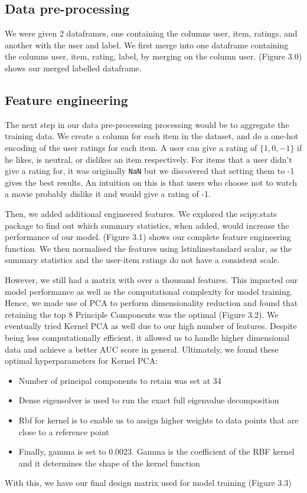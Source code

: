\documentclass[12pt]{article}
\begin{document}
\subsection{Data pre-processing}
We were given 2 dataframes, one containing the columns user, item, ratings, and another with the user and label. We first merge into one dataframe containing the columns user, item, rating, label, by merging on the column user. (Figure 3.0) shows our merged labelled dataframe.
\subsection{Feature engineering}
The next step in our data pre-processing processing would be to aggregate the training data. We create a column for each item in the dataset, and do a one-hot encoding of the user ratings for each item. A user can give a rating of $\{1, 0, -1\}$ if he likes, is neutral, or dislikes an item respectively. For items that a user didn't give a rating for, it was originally \lstinline{NaN} but we discovered that setting them to -1 gives the best results. An intuition on this is that users who choose not to watch a movie probably dislike it and would give a rating of -1.

Then, we added additional engineered features. We explored the scipy.stats package to find out which summary statistics, when added, would increase the performance of our model. (Figure 3.1) shows our complete feature engineering function. We then normalised the features using lstinline{standard scalar}, as the summary statistics and the user-item ratings do not have a consistent scale.

However, we still had a matrix with over a thousand features. This impacted our model performance as well as the computational complexity for model training. Hence, we made use of PCA to perform dimensionality reduction and found that retaining the top 8 Principle Components was the optimal (Figure 3.2). We eventually tried Kernel PCA as well due to our high number of features. Despite being less computationally efficient, it allowed us to handle higher dimensional data and achieve a better AUC score in general. Ultimately, we found these optimal hyperparameters for Kernel PCA:
\begin{itemize}
  \item Number of principal components to retain was set at 34
  \item Dense eigensolver is used to run the exact full eigenvalue decomposition
  \item Rbf for kernel is to enable us to assign higher weights to data points that are close to a reference point
  \item Finally, gamma is set to 0.0023. Gamma is the coefficient of the RBF kernel and it determines the shape of the kernel function
\end{itemize}
With this, we have our final design matrix used for model training (Figure 3.3)
\end{document}
